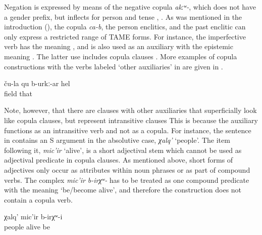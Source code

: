 Negation is expressed by means of the negative copula \textit{akːʷ-}, which does not have a gender prefix, but inflects for person and tense , . As was mentioned in the introduction (), the copula \textit{ca-b}, the person enclitics, and the past enclitic can only express a restricted range of TAME forms. For instance, the imperfective verb  has the meaning , and is also used as an auxiliary with the epistemic meaning . The latter use includes copula clauses . More examples of copula constructions with the verbs labeled `other auxiliaries' in  are given in .

 \begin{exe}
 \ex	\label{That is probably their field.}
\gll ču-la	qu	b-urkː-ar	hel	\\
	field		that	\\
 \glt	{}
\end{exe}

Note, however, that there are clauses with other auxiliaries that superficially look like copula clauses, but represent intransitive clauses This is because the auxiliary functions as an intransitive verb and not as a copula. For instance, the sentence in  contains an S argument in the absolutive case, \textit{χalq'} `people'. The item following it, \textit{mic'ir} `alive', is a short adjectival stem which cannot be used as adjectival predicate in copula clauses. As mentioned above, short forms of adjectives only occur as attributes within noun phrases or as part of compound verbs. The complex  \textit{mic'ir	b-irχʷ-} has to be treated as one compound predicate with the meaning `be\slash become alive', and therefore the construction does not contain a copula verb.
 
 \begin{exe}
	\ex	\label{ex:peopleusedtobealive}
	\gll	χalq'	mic'ir	b-irχʷ-i\\
		people	alive	be\\
	\glt	{}
\end{exe}



